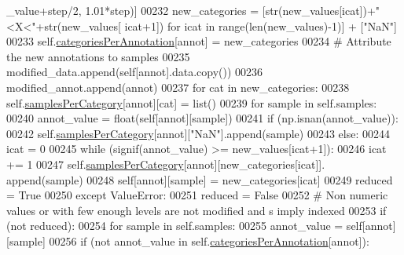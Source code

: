 \begin{DoxyCode}
      \_value+step/2, 1.01*step)]
00232                     new\_categories = [str(new\_values[icat])+\textcolor{stringliteral}{"<X<"}+str(new\_values[
      icat+1]) \textcolor{keywordflow}{for} icat \textcolor{keywordflow}{in} range(len(new\_values)-1)] + [\textcolor{stringliteral}{"NaN"}]
00233                     self.\hyperlink{classnavicom_1_1navidata_1_1NaviAnnotations_a1c26e115cb2eabe4384cd2fa0c7f776f}{categoriesPerAnnotation}[annot] = new\_categories
00234                     \textcolor{comment}{# Attribute the new annotations to samples}
00235                     modified\_data.append(self[annot].data.copy())
00236                     modified\_annot.append(annot)
00237                     \textcolor{keywordflow}{for} cat \textcolor{keywordflow}{in} new\_categories:
00238                         self.\hyperlink{classnavicom_1_1navidata_1_1NaviAnnotations_a7cbb4ab623948f19e055f5b4b7c938a9}{samplesPerCategory}[annot][cat] = list()
00239                     \textcolor{keywordflow}{for} sample \textcolor{keywordflow}{in} self.samples:
00240                         annot\_value = float(self[annot][sample])
00241                         \textcolor{keywordflow}{if} (np.isnan(annot\_value)):
00242                             self.\hyperlink{classnavicom_1_1navidata_1_1NaviAnnotations_a7cbb4ab623948f19e055f5b4b7c938a9}{samplesPerCategory}[annot][\textcolor{stringliteral}{"NaN"}].append(sample)
00243                         \textcolor{keywordflow}{else}:
00244                             icat = 0
00245                             \textcolor{keywordflow}{while} (signif(annot\_value) >= new\_values[icat+1]):
00246                                 icat += 1
00247                             self.\hyperlink{classnavicom_1_1navidata_1_1NaviAnnotations_a7cbb4ab623948f19e055f5b4b7c938a9}{samplesPerCategory}[annot][new\_categories[icat]].
      append(sample)
00248                             self[annot][sample] = new\_categories[icat]
00249                     reduced = \textcolor{keyword}{True}
00250                 \textcolor{keywordflow}{except} ValueError: 
00251                     reduced = \textcolor{keyword}{False}
00252             \textcolor{comment}{# Non numeric values or with few enough levels are not modified and s
      imply indexed}
00253             \textcolor{keywordflow}{if} (\textcolor{keywordflow}{not} reduced):
00254                 \textcolor{keywordflow}{for} sample \textcolor{keywordflow}{in} self.samples:
00255                     annot\_value = self[annot][sample]
00256                     \textcolor{keywordflow}{if} (\textcolor{keywordflow}{not} annot\_value \textcolor{keywordflow}{in} self.\hyperlink{classnavicom_1_1navidata_1_1NaviAnnotations_a1c26e115cb2eabe4384cd2fa0c7f776f}{categoriesPerAnnotation}[annot]):

\end{DoxyCode}
